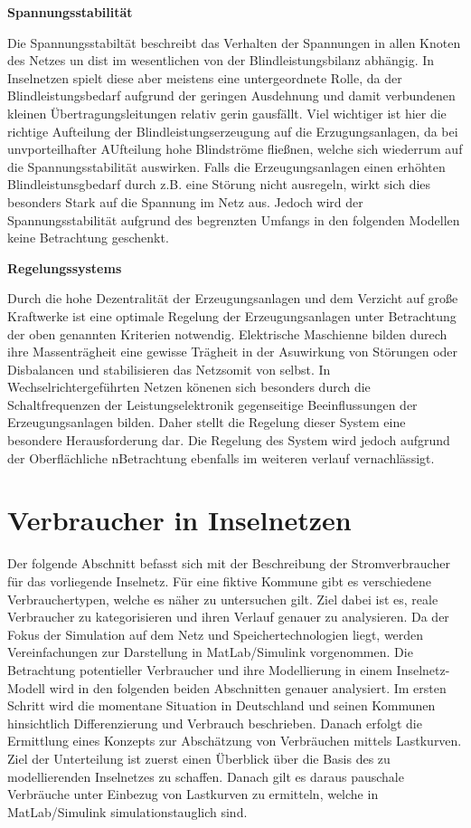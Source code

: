 \textbf{Spannungsstabilität}

Die Spannungsstabiltät beschreibt das Verhalten der Spannungen in allen Knoten des Netzes un dist im wesentlichen von der Blindleistungsbilanz abhängig. In Inselnetzen spielt diese aber meistens eine untergeordnete Rolle, da der Blindleistungsbedarf aufgrund der geringen Ausdehnung und damit verbundenen kleinen Übertragungsleitungen relativ gerin gausfällt. Viel wichtiger ist hier die richtige Aufteilung der Blindleistungserzeugung auf die Erzugungsanlagen, da bei unvporteilhafter AUfteilung hohe Blindströme fließnen, welche sich wiederrum auf die Spannungsstabilität auswirken. Falls die Erzeugungsanlagen einen erhöhten Blindleistunsgbedarf durch z.B. eine Störung nicht ausregeln, wirkt sich dies besonders Stark auf die Spannung im Netz aus. Jedoch wird der Spannungsstabilität aufgrund des begrenzten Umfangs in den folgenden Modellen keine Betrachtung geschenkt.

\textbf{Regelungssystems}

Durch die hohe Dezentralität der Erzeugungsanlagen und dem Verzicht auf große Kraftwerke ist eine optimale Regelung der Erzeugungsanlagen unter Betrachtung der oben genannten Kriterien notwendig. Elektrische Maschienne bilden durech ihre Massenträgheit eine gewisse Trägheit in der Asuwirkung von Störungen oder Disbalancen und stabilisieren das Netzsomit von selbst. In Wechselrichtergeführten Netzen könenen sich besonders durch die Schaltfrequenzen der Leistungselektronik gegenseitige Beeinflussungen der Erzeugungsanlagen bilden. Daher stellt die Regelung dieser System eine besondere Herausforderung dar. Die Regelung des System wird jedoch aufgrund der Oberflächliche nBetrachtung ebenfalls im weiteren verlauf vernachlässigt.



\section{Verbraucher in Inselnetzen}

Der folgende Abschnitt befasst sich mit der Beschreibung der Stromverbraucher für das vorliegende Inselnetz. 
Für eine fiktive Kommune gibt es verschiedene Verbrauchertypen, welche es näher zu untersuchen gilt. 
Ziel dabei ist es, reale Verbraucher zu kategorisieren und ihren Verlauf genauer zu analysieren. 
Da der Fokus der Simulation auf dem Netz und Speichertechnologien liegt, werden Vereinfachungen zur Darstellung in MatLab/Simulink vorgenommen.
Die Betrachtung potentieller Verbraucher und ihre Modellierung in einem Inselnetz-Modell wird in den folgenden beiden Abschnitten genauer analysiert. 
Im ersten Schritt wird die momentane Situation in Deutschland und seinen Kommunen hinsichtlich Differenzierung und Verbrauch beschrieben. 
Danach erfolgt die Ermittlung eines Konzepts zur Abschätzung von Verbräuchen mittels Lastkurven. 
Ziel der Unterteilung ist zuerst einen Überblick über die Basis des zu modellierenden Inselnetzes zu schaffen. 
Danach gilt es daraus pauschale Verbräuche unter Einbezug von Lastkurven zu ermitteln, welche in MatLab/Simulink simulationstauglich sind.

